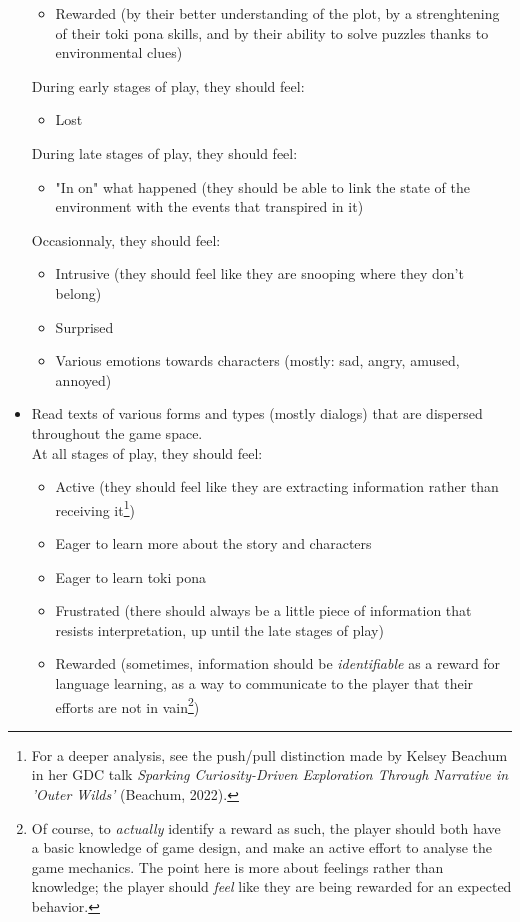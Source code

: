 \documentclass{scrartcl}
\begin{document}
\begin{itemize}
\begin{itemize}
					\item Rewarded (by their better understanding of the plot, by a strenghtening of their toki pona skills, and by their ability to solve puzzles thanks to environmental clues)
				\end{itemize}
				During early stages of play, they should feel: 
				\begin{itemize}
					\item Lost
				\end{itemize}
				During late stages of play, they should feel:
				\begin{itemize}
					\item "In on" what happened (they should be able to link the state of the environment with the events that transpired in it)
				\end{itemize}
				Occasionnaly, they should feel:
				\begin{itemize}
					\item Intrusive (they should feel like they are snooping where they don't belong)
					\item Surprised
					\item Various emotions towards characters (mostly: sad, angry, amused, annoyed)
				\end{itemize}
				\item Read texts of various forms and types (mostly dialogs) that are dispersed throughout the game space.\\
				At all stages of play, they should feel:
				\begin{itemize}
					\item Active (they should feel like they are extracting information rather than receiving it\footnote{For a deeper analysis, see the push/pull distinction made by Kelsey Beachum in her GDC talk \textit{Sparking Curiosity-Driven Exploration Through Narrative in 'Outer Wilds'} (Beachum, 2022).})
					\item Eager to learn more about the story and characters
					\item Eager to learn toki pona
					\item Frustrated (there should always be a little piece of information that resists interpretation, up until the late stages of play)
					\item Rewarded (sometimes, information should be \textit{identifiable} as a reward for language learning, as a way to communicate to the player that their efforts are not in vain\footnote{Of course, to \textit{actually} identify a reward as such, the player should both have a basic knowledge of game design, and make an active effort to analyse the game mechanics. The point here is more about feelings rather than knowledge; the player should \textit{feel} like they are being rewarded for an expected behavior.})

\end{itemize}
\end{itemize}
\end{document}
